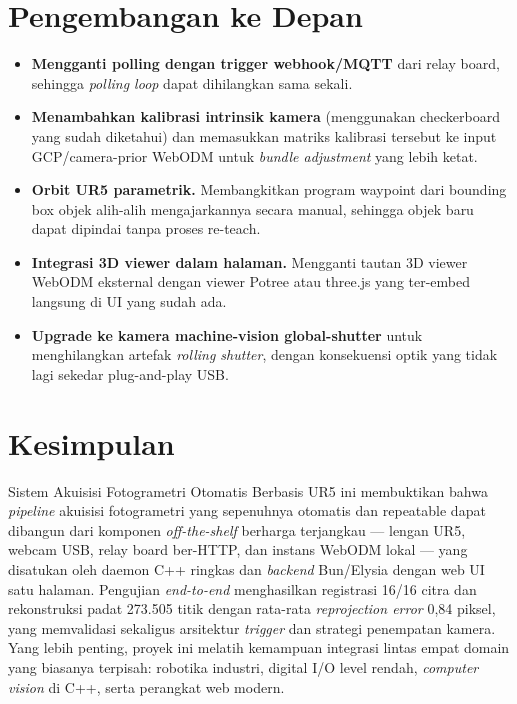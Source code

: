 \documentclass[11pt,a4paper]{article}
\begin{document}
\section{Pengembangan ke Depan}

\begin{itemize}[leftmargin=1.4em,itemsep=3pt]
    \item \textbf{Mengganti polling dengan trigger webhook/MQTT} dari relay board, sehingga \textit{polling loop} dapat dihilangkan sama sekali.
    \item \textbf{Menambahkan kalibrasi intrinsik kamera} (menggunakan checkerboard yang sudah diketahui) dan memasukkan matriks kalibrasi tersebut ke input GCP/camera-prior WebODM untuk \textit{bundle adjustment} yang lebih ketat.
    \item \textbf{Orbit UR5 parametrik.} Membangkitkan program waypoint dari bounding box objek alih-alih mengajarkannya secara manual, sehingga objek baru dapat dipindai tanpa proses re-teach.
    \item \textbf{Integrasi 3D viewer dalam halaman.} Mengganti tautan 3D viewer WebODM eksternal dengan viewer Potree atau three.js yang ter-embed langsung di UI yang sudah ada.
    \item \textbf{Upgrade ke kamera machine-vision global-shutter} untuk menghilangkan artefak \textit{rolling shutter}, dengan konsekuensi optik yang tidak lagi sekedar plug-and-play USB.
\end{itemize}

\section{Kesimpulan}

Sistem Akuisisi Fotogrametri Otomatis Berbasis UR5 ini membuktikan bahwa \textit{pipeline} akuisisi fotogrametri yang sepenuhnya otomatis dan repeatable dapat dibangun dari komponen \textit{off-the-shelf} berharga terjangkau --- lengan UR5, webcam USB, relay board ber-HTTP, dan instans WebODM lokal --- yang disatukan oleh daemon C++ ringkas dan \textit{backend} Bun/Elysia dengan web UI satu halaman. Pengujian \textit{end-to-end} menghasilkan registrasi 16/16 citra dan rekonstruksi padat 273.505 titik dengan rata-rata \textit{reprojection error} 0,84 piksel, yang memvalidasi sekaligus arsitektur \textit{trigger} dan strategi penempatan kamera. Yang lebih penting, proyek ini melatih kemampuan integrasi lintas empat domain yang biasanya terpisah: robotika industri, digital I/O level rendah, \textit{computer vision} di C++, serta perangkat web modern.
\end{document}
